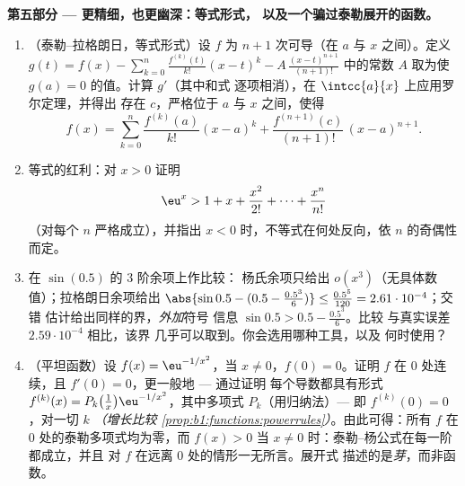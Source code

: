 \begin{problem}
\medskip
\noindent\textbf{第五部分 --- 更精细，也更幽深：等式形式，
以及一个骗过泰勒展开的函数。}
\begin{enumerate}[resume]
  \item （泰勒–拉格朗日，等式形式）设 $f$ 为 $n + 1$
        次可导（在 $a$ 与 $x$ 之间）。定义 $g(t) =
        f(x) - \sum_{k=0}^{n} \frac{f^{(k)}(t)}{k!}(x - t)^k -
        A\,\frac{(x-t)^{n+1}}{(n+1)!}$ 中的常数 $A$
        取为使 $g(a) = 0$ 的值。计算 $g'$（其中和式
        逐项相消），在 $\intcc{a}{x}$ 上应用罗尔定理，并得出
        存在 $c$，严格位于 $a$ 与 $x$ 之间，使得
        \[
        f(x) = \sum_{k=0}^{n} \frac{f^{(k)}(a)}{k!}(x-a)^k
        + \frac{f^{(n+1)}(c)}{(n+1)!}\,(x-a)^{n+1} .
        \]
  \item 等式的红利：对 $x > 0$ 证明
        \[
        \eu^x > 1 + x + \frac{x^2}{2!} + \dots +
        \frac{x^n}{n!}
        \]
        （对每个 $n$ 严格成立），并指出
        $x < 0$ 时，不等式在何处反向，依
        $n$ 的奇偶性而定。
  \item 在 $\sin(0.5)$ 的 $3$ 阶余项上作比较：
        杨氏余项只给出 $o(x^3)$（无具体数值）；拉格朗日余项给出
        $\abs{\sin 0.5 - (0.5 - \frac{0.5^3}{6})} \leq
        \frac{0.5^5}{120} = 2.61\cdot10^{-4}$；交错
        估计给出同样的界，\emph{外加}符号
        信息 $\sin 0.5 > 0.5 - \frac{0.5^3}{6}$。比较
        与真实误差 $2.59\cdot10^{-4}$ 相比，该界
        几乎可以取到。你会选用哪种工具，以及
        何时使用？
  \item （平坦函数）设 $f(x) = \eu^{-1/x^2}$，当 $x
        \neq 0$，$f(0) = 0$。证明 $f$ 在 $0$ 处连续，且
        $f'(0) = 0$，更一般地 --- 通过证明
        每个导数都具有形式 $f^{(k)}(x) =
        P_k\bigl(\frac1x\bigr)\eu^{-1/x^2}$，其中多项式
        $P_k$（用归纳法）--- 即 $f^{(k)}(0) = 0$，对一切 $k$
        \emph{（增长比较
        \cref{prop:b1:functions:powerrules}）}。由此可得：所有
        $f$ 在 $0$ 处的泰勒多项式均为零，而 $f(x) > 0$
        当 $x \neq 0$ 时：泰勒–杨公式在每一阶都成立，并且
        对 $f$ 在远离 $0$ 处的情形一无所言。展开式
        描述的是\emph{芽}，而非函数。
\end{enumerate}


\end{problem}
